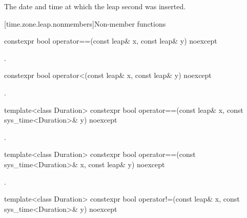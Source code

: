 \begin{itemdescr}
\pnum
\returns The date and time at which the leap second was inserted.
\end{itemdescr}

[time.zone.leap.nonmembers]{Non-member functions}

%
\begin{itemdecl}
constexpr bool operator==(const leap& x, const leap& y) noexcept
\end{itemdecl}

\begin{itemdescr}
\pnum
\returns {}.
\end{itemdescr}

%
\begin{itemdecl}
constexpr bool operator<(const leap& x, const leap& y) noexcept
\end{itemdecl}

\begin{itemdescr}
\pnum
\returns {}.
\end{itemdescr}

%
%
\begin{itemdecl}
template<class Duration>
  constexpr bool operator==(const leap& x, const sys_time<Duration>& y) noexcept
\end{itemdecl}

\begin{itemdescr}
\pnum
\returns {}.
\end{itemdescr}

%
%
\begin{itemdecl}
template<class Duration>
  constexpr bool operator==(const sys_time<Duration>& x, const leap& y) noexcept
\end{itemdecl}

\begin{itemdescr}
\pnum
\returns {}.
\end{itemdescr}

%
%
\begin{itemdecl}
template<class Duration>
  constexpr bool operator!=(const leap& x, const sys_time<Duration>& y) noexcept
\end{itemdecl}

